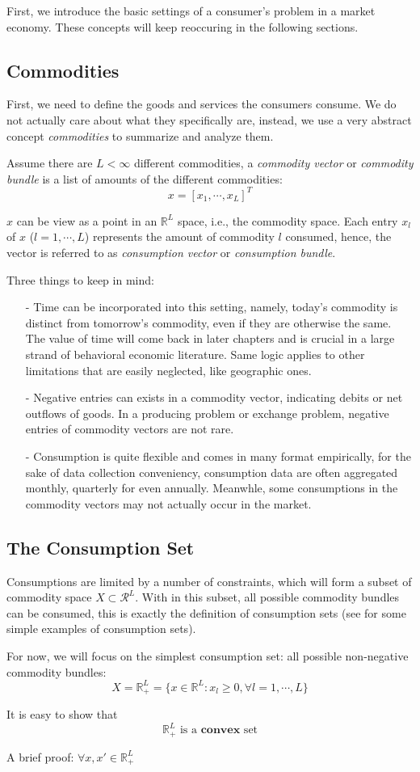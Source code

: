 First, we introduce the basic settings of a consumer's problem in a market economy. These concepts will keep reoccuring in the following sections.

\subsection{Commodities}
First, we need to define the goods and services the consumers consume. We do not actually care about what they specifically are, instead, we use a very abstract concept \textit{commodities}
to summarize and analyze them.
\begin{definition}
    Assume there are $L<\infty$ different commodities, a \textit{commodity vector} or \textit{commodity bundle} is a list of amounts of the different commodities:$$x=\left[x_1,\cdots,x_L\right]^T$$
\end{definition}
$x$ can be view as a point in an $\mathbb{R}^L$ space, i.e., the commodity space. Each entry $x_l$ of $x$ ($l=1,\cdots,L$) represents the amount of commodity $l$ consumed, hence, the vector is referred to
as \textit{consumption vector} or \textit{consumption bundle}.

Three things to keep in mind:
\begin{enumerate}
    \item[-] Time can be incorporated into this setting, namely, today's commodity is distinct from tomorrow's commodity, even if they are otherwise the same. The value of time will come back in later chapters and is crucial in a large strand of behavioral economic literature. Same logic applies to other limitations that are easily neglected, like geographic ones.
    \item[-] Negative entries can exists in a commodity vector, indicating debits or net outflows of goods. In a producing problem or exchange problem, negative entries of commodity vectors are not rare.
    \item[-] Consumption is quite flexible and comes in many format empirically, for the sake of data collection conveniency, consumption data are often aggregated monthly, quarterly for even annually. Meanwhle, some consumptions in the commodity vectors may not actually occur in the market.
\end{enumerate}

\subsection{The Consumption Set}
Consumptions are limited by a number of constraints, which will form a subset of commodity space $X\subset \mathcal{R}^L$. With in this subset, all possible commodity bundles can be 
consumed, this is exactly the definition of consumption sets (see \citet[Page 19-20]{mas1995microeconomic} for some simple examples of consumption sets).

For now, we will focus on the simplest consumption set: all possible non-negative commodity bundles:
$$X=\mathbb{R}^L_+=\{x\in \mathbb{R}^L: x_l\geq 0,\forall l=1,\cdots, L\}$$

It is easy to show that
$$\mathbb{R}^L_+ \text{ is a }\textbf{convex} \text{ set}$$

A brief proof: $\forall x,x'\in \mathbb{R}^L_+$